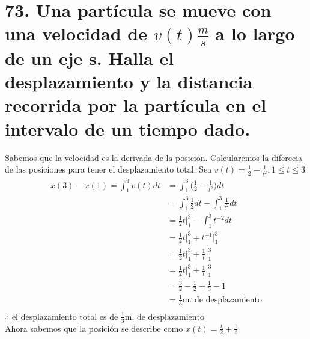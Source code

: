 \chapter*{73. Una partícula se mueve con una velocidad de $v(t)\frac{m}{s}$ a lo largo de un eje s. Halla el desplazamiento y la distancia recorrida por la partícula en el intervalo de un tiempo dado.}

Sabemos que la velocidad es la derivada de la posición.
Calcularemos la diferecia de las posiciones para tener el desplazamiento total.
Sea $v(t)=\displaystyle\frac{1}{2}-\frac{1}{t^2},1\leq t \leq 3 $
\begin{align*}
	x(3)-x(1)=\int_{1}^{3}v(t)dt & =\int_{1}^{3}\big(\frac{1}{2}-\frac{1}{t^2}\big)dt      \\
	                             & =\int_{1}^{3}\frac{1}{2}dt -\int_{1}^{3}\frac{1}{t^2}dt \\
	                             & =\frac{1}{2}t\bigg|_1^3-\int_{1}^{3}t^{-2}dt            \\
	                             & =\frac{1}{2}t\bigg|_1^3+t^{-1}\bigg|_{1}^{3}            \\
	                             & =\frac{1}{2}t\bigg|_1^3+\frac{1}{t}\bigg|_{1}^{3}       \\
	                             & =\frac{1}{2}t\bigg|_1^3+\frac{1}{t}\bigg|_{1}^{3}       \\
	                             & =\frac{3}{2}-\frac{1}{2}+\frac{1}{3}-1                  \\
	                             & =\frac{1}{3}\text{m. de desplazamiento}                 \\
\end{align*}
$\therefore$ el desplazamiento total es de  $\frac{1}{3}\text{m. de desplazamiento}$\\
Ahora sabemos que la posición se describe como $x(t)=\frac{t}{2}+\frac{1}{t}$

